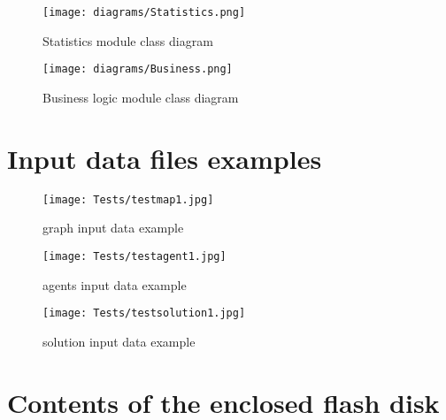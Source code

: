 \documentclass[thesis=B,english]{FITthesis}[2019/12/23]
\begin{document}
\begin{figure}
	\texttt{[image: diagrams/Statistics.png]}
	\caption[Statistics module class diagams]{Statistics module class diagram}
\end{figure}

\begin{figure}
	\texttt{[image: diagrams/Business.png]}
	\caption[Business logic module class diagram]{Business logic module class diagram}
\end{figure}

\chapter{Input data files examples}

\begin{figure}[H]
	\texttt{[image: Tests/testmap1.jpg]}
	\caption[graph input data example]{graph input data example}
\end{figure}

\begin{figure}[H]
	\texttt{[image: Tests/testagent1.jpg]}
	\caption[agents input data example]{agents input data example}
\end{figure}

\begin{figure}[H]
	\texttt{[image: Tests/testsolution1.jpg]}
	\caption[solution input data example]{solution input data example}
\end{figure}

\chapter{Contents of the enclosed flash disk}



\begin{figure}
\end{figure}
\end{document}
